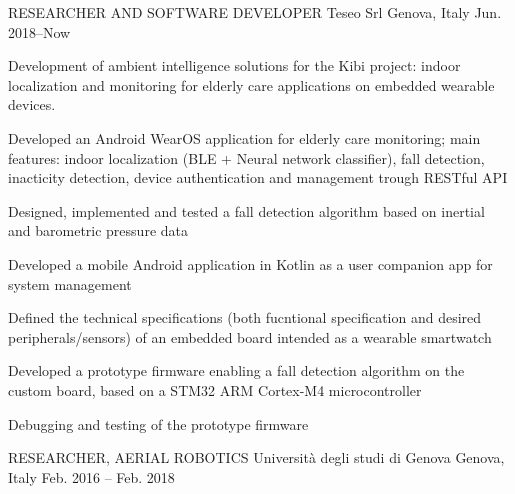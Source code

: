 

\begin{cventries}

  \cventry
    {RESEARCHER AND SOFTWARE DEVELOPER} %
    {Teseo Srl} %
    {Genova, Italy} %
    {Jun. 2018--Now} %
    {
      \begin{cvparagraph}
      Development of ambient intelligence solutions for the Kibi project: indoor localization and monitoring for elderly care applications on embedded wearable devices.
      \end{cvparagraph}
      \begin{cvitems} %
        \item {Developed an Android WearOS application for elderly care monitoring; main features: indoor localization (BLE + Neural network classifier), fall detection, inacticity detection, device authentication and management trough RESTful API}
        \item {Designed, implemented and tested a fall detection algorithm based on inertial and barometric pressure data}
        \item {Developed a mobile Android application in Kotlin as a user companion app for system management}
        \item {Defined the technical specifications (both fucntional specification and desired peripherals/sensors) of an embedded board intended as a wearable smartwatch}
        \item {
          Developed a prototype firmware enabling a fall detection algorithm on the custom board, based on a STM32 ARM Cortex-M4 microcontroller
        }
        \item{Debugging and testing of the prototype firmware} 
      \end{cvitems}
    }
  \cventry
    {RESEARCHER, AERIAL ROBOTICS} %
    {Università degli studi di Genova} %
    {Genova, Italy} %
    {Feb. 2016 – Feb. 2018} %

\end{cventries}
